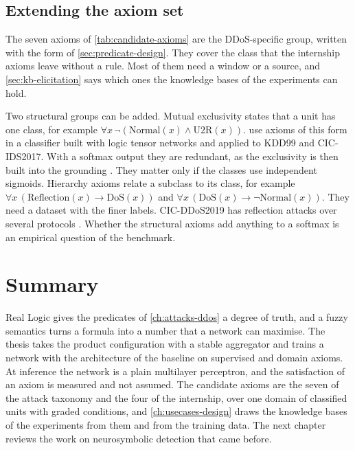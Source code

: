 \subsection{Extending the axiom set}
\label{sec:ddos-axioms}

The seven axioms of \cref{tab:candidate-axioms} are the DDoS-specific group,
written with the form of \cref{sec:predicate-design}. They cover the class that
the internship axioms leave without a rule. Most of them need a window or a
source, and \cref{sec:kb-elicitation} says which ones the knowledge bases of the
experiments can hold.

Two structural groups can be added. Mutual exclusivity states that a unit has
one class, for example $\forall x\,\neg(\mathrm{Normal}(x)\wedge\mathrm{U2R}(x))$.
\citet{onchis2022neurosymbolic} use axioms of this form in a classifier built
with logic tensor networks and applied to KDD99 and CIC-IDS2017. With a softmax
output they are redundant, as the exclusivity is then built into the grounding
\citep{badreddine2022ltn}. They matter only if the classes use independent
sigmoids. Hierarchy axioms relate a subclass to its class, for example
$\forall x\,(\mathrm{Reflection}(x)\rightarrow\mathrm{DoS}(x))$ and
$\forall x\,(\mathrm{DoS}(x)\rightarrow\neg\mathrm{Normal}(x))$. They need a
dataset with the finer labels. CIC-DDoS2019 has reflection attacks over several
protocols \citep{cic2019ddos}. Whether the structural axioms add anything to
a softmax is an empirical question of the benchmark.

\section{Summary}
\label{sec:ch5-summary}

Real Logic gives the predicates of \cref{ch:attacks-ddos} a degree of truth, and
a fuzzy semantics turns a formula into a number that a network can maximise.
The thesis takes the product configuration with a stable aggregator and
trains a network with the architecture of the baseline on supervised and domain axioms. At inference
the network is a plain multilayer perceptron, and the satisfaction of an axiom
is measured and not assumed. The candidate axioms are the seven of the attack
taxonomy and the four of the internship, over one domain of classified units with
graded conditions, and \cref{ch:usecases-design} draws the knowledge bases of the
experiments from them and from the training data. The next chapter reviews the work on neurosymbolic detection
that came before.